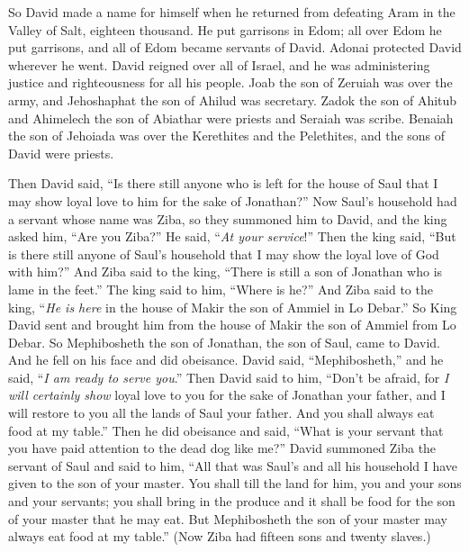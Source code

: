\begin{biblechapter}
\verse So David made a name for himself when he returned from defeating Aram in the Valley of Salt, eighteen thousand.
\verse He put garrisons in Edom; all over Edom he put garrisons, and all of Edom became servants of David. Adonai protected David wherever he went.
\verse David reigned over all of Israel, and he was administering justice and righteousness for all his people.
\verse Joab the son of Zeruiah was over the army, and Jehoshaphat the son of Ahilud was secretary.
\verse Zadok the son of Ahitub and Ahimelech the son of Abiathar were priests and Seraiah was scribe.
\verse Benaiah the son of Jehoiada was over the Kerethites and the Pelethites, and the sons of David were priests.
\end{biblechapter}

\begin{biblechapter} %
 Then David said, “Is there still anyone who is left for the house of Saul that I may show loyal love to him for the sake of Jonathan?”
\verse Now Saul’s household had a servant whose name was Ziba, so they summoned him to David, and the king asked him, “Are you Ziba?” He said, “\textit{At your service}!”
\verse Then the king said, “But is there still anyone of Saul’s household that I may show the loyal love of God with him?” And Ziba said to the king, “There is still a son of Jonathan who is lame in the feet.”
\verse The king said to him, “Where is he?” And Ziba said to the king, “\textit{He is here} in the house of Makir the son of Ammiel in Lo Debar.”
\verse So King David sent and brought him from the house of Makir the son of Ammiel from Lo Debar.
\verse So Mephibosheth the son of Jonathan, the son of Saul, came to David. And he fell on his face and did obeisance. David said, “Mephibosheth,” and he said, “\textit{I am ready to serve you}.”
\verse Then David said to him, “Don’t be afraid, for \textit{I will certainly show} loyal love to you for the sake of Jonathan your father, and I will restore to you all the lands of Saul your father. And you shall always eat food at my table.”
\verse Then he did obeisance and said, “What is your servant that you have paid attention to the dead dog like me?”
\verse David summoned Ziba the servant of Saul and said to him, “All that was Saul’s and all his household I have given to the son of your master.
\verse You shall till the land for him, you and your sons and your servants; you shall bring in the produce and it shall be food for the son of your master that he may eat. But Mephibosheth the son of your master may always eat food at my table.” (Now Ziba had fifteen sons and twenty slaves.)

\end{biblechapter}
